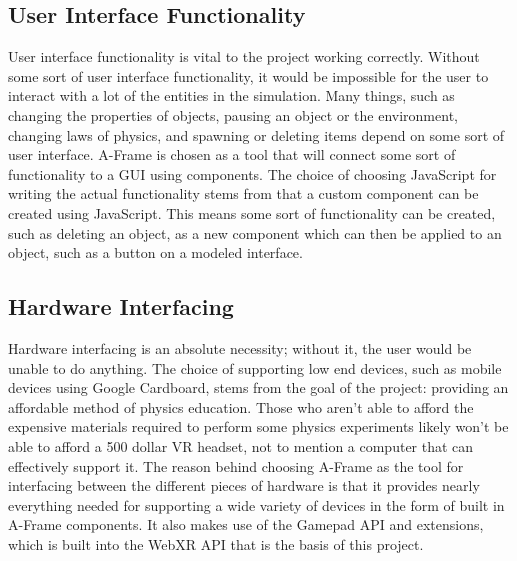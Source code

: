 \documentclass[onecolumn, draftclsnofoot,10pt, compsoc]{IEEEtran}
\begin{document}
\subsection{User Interface Functionality}
User interface functionality is vital to the project working correctly. Without some sort of user interface functionality, it would be impossible for the user to interact with a lot of the entities in the simulation. Many things, such as changing the properties of objects, pausing an object or the environment, changing laws of physics, and spawning or deleting items depend on some sort of user interface. A-Frame is chosen as a tool that will connect some sort of functionality to a GUI using components. The choice of choosing JavaScript for writing the actual functionality stems from that a custom component can be created using JavaScript. This means some sort of functionality can be created, such as deleting an object, as a new component which can then be applied to an object, such as a button on a modeled interface.

\subsection{Hardware Interfacing}
Hardware interfacing is an absolute necessity; without it, the user would be unable to do anything. The choice of supporting low end devices, such as mobile devices using Google Cardboard, stems from the goal of the project: providing an affordable method of physics education. Those who aren't able to afford the expensive materials required to perform some physics experiments likely won't be able to afford a 500 dollar VR headset, not to mention a computer that can effectively support it. The reason behind choosing A-Frame as the tool for interfacing between the different pieces of hardware is that it provides nearly everything needed for supporting a wide variety of devices in the form of built in A-Frame components. It also makes use of the Gamepad API and extensions, which is built into the WebXR API that is the basis of this project. 
\end{document}
